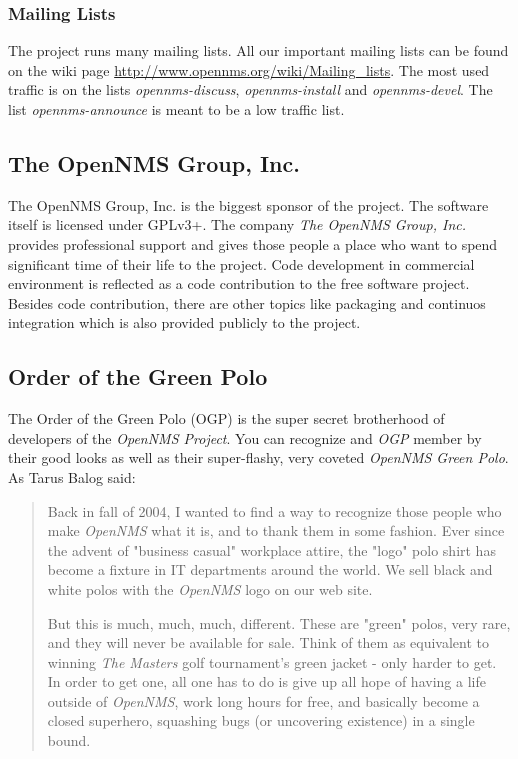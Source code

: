 \subsubsection{Mailing Lists}
The project runs many mailing lists. All our important mailing lists can be found on the wiki page \url{http://www.opennms.org/wiki/Mailing_lists}. The most used traffic is on the lists \emph{opennms-discuss}, \emph{opennms-install} and \emph{opennms-devel}. The list \emph{opennms-announce} is meant to be a low traffic list.

\subsection*{The OpenNMS Group, Inc.}
The OpenNMS Group, Inc. is the biggest sponsor of the project. The software itself is licensed under GPLv3+. The company \emph{The OpenNMS Group, Inc.} provides professional support and gives those people a place who want to spend significant time of their life to the project. Code development in commercial environment is reflected as a code contribution to the free software project. Besides code contribution, there are other topics like packaging and continuos integration which is also provided publicly to the project.

\subsection*{Order of the Green Polo}
The Order of the Green Polo (OGP) is the super secret brotherhood of developers of the \emph{OpenNMS Project}. You can recognize and \emph{OGP} member by their good looks as well as their super-flashy, very coveted \emph{OpenNMS Green Polo}. As Tarus Balog said:
 
\begin{quote}
Back in fall of 2004, I wanted to find a way to recognize those people who make \emph{OpenNMS} what it is, and to thank them in some fashion. 
Ever since the advent of "business casual" workplace attire, the "logo" polo shirt has become a fixture in IT departments around the world. We sell black and white polos with the \emph{OpenNMS} logo on our web site.

But this is much, much, much, different. These are "green" polos, very rare, and they will never be available for sale. Think of them as equivalent to winning \emph{The Masters} golf tournament's green jacket - only harder to get.
In order to get one, all one has to do is give up all hope of having a life outside of \emph{OpenNMS}, work long hours for free, and basically become a closed superhero, squashing bugs (or uncovering existence) in a single bound.
\end{quote}

